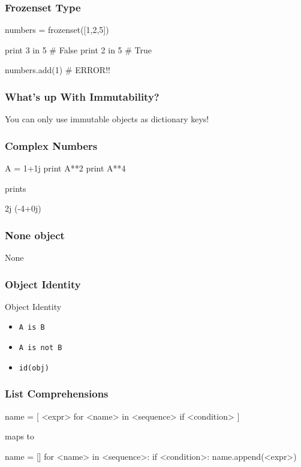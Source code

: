 \begin{frame}[fragile]
\frametitle{Frozenset Type}

\begin{python}
numbers = frozenset([1,2,5])

print 3 in 5 # False
print 2 in 5 # True

numbers.add(1) # ERROR!!
\end{python}

\end{frame}

\begin{frame}[fragile]
\frametitle{What's up With Immutability?}

\pause
You can only use \alert{immutable} objects as dictionary keys!

\end{frame}

\begin{frame}[fragile]
\frametitle{Complex Numbers}
\begin{python}
A = 1+1j
print A**2
print A**4
\end{python}

prints

\begin{python}
2j
(-4+0j)
\end{python}
\end{frame}


\begin{frame}[fragile]
\frametitle{None object}

\begin{python}
None
\end{python}
\end{frame}

\begin{frame}[fragile]
\frametitle{Object Identity}

\begin{block}{Object Identity}
\begin{itemize}
\item \lstinline{A is B}
\item \lstinline{A is not B}
\item \lstinline{id(obj)}
\end{itemize}
\end{block}

\end{frame}

\begin{frame}[fragile]
\frametitle{List Comprehensions}

\begin{python}
name = [ <expr> for <name> in <sequence> if <condition> ]
\end{python}

maps to

\begin{python}
name = []
for <name> in <sequence>:
    if <condition>:
        name.append(<expr>)
\end{python}

\end{frame}

